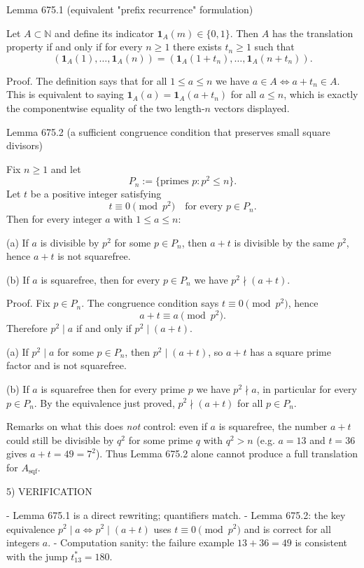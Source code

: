 Lemma 675.1 (equivalent "prefix recurrence" formulation)

Let $A\subset\mathbb N$ and define its indicator $\mathbf 1_A(m)\in\{0,1\}$. Then $A$ has the translation property if and only if for every $n\ge 1$ there exists $t_n\ge 1$ such that
\[
(\mathbf 1_A(1),\dots,\mathbf 1_A(n))=(\mathbf 1_A(1+t_n),\dots,\mathbf 1_A(n+t_n)).
\]

Proof.
The definition says that for all $1\le a\le n$ we have $a\in A\iff a+t_n\in A$. This is equivalent to saying $\mathbf 1_A(a)=\mathbf 1_A(a+t_n)$ for all $a\le n$, which is exactly the componentwise equality of the two length-$n$ vectors displayed.


Lemma 675.2 (a sufficient congruence condition that preserves small square divisors)

Fix $n\ge 1$ and let
\[
P_n:=\{\text{primes }p: p^2\le n\}.
\]
Let $t$ be a positive integer satisfying
\[
 t\equiv 0\pmod{p^2}\quad\text{for every }p\in P_n.
\]
Then for every integer $a$ with $1\le a\le n$:

(a) If $a$ is divisible by $p^2$ for some $p\in P_n$, then $a+t$ is divisible by the same $p^2$, hence $a+t$ is not squarefree.

(b) If $a$ is squarefree, then for every $p\in P_n$ we have $p^2\nmid (a+t)$.

Proof.
Fix $p\in P_n$. The congruence condition says $t\equiv 0\pmod{p^2}$, hence
\[
 a+t\equiv a\pmod{p^2}.
\]
Therefore $p^2\mid a$ if and only if $p^2\mid (a+t)$.

(a) If $p^2\mid a$ for some $p\in P_n$, then $p^2\mid(a+t)$, so $a+t$ has a square prime factor and is not squarefree.

(b) If $a$ is squarefree then for every prime $p$ we have $p^2\nmid a$, in particular for every $p\in P_n$. By the equivalence just proved, $p^2\nmid(a+t)$ for all $p\in P_n$.


Remarks on what this does \emph{not} control: even if $a$ is squarefree, the number $a+t$ could still be divisible by $q^2$ for some prime $q$ with $q^2>n$ (e.g. $a=13$ and $t=36$ gives $a+t=49=7^2$). Thus Lemma 675.2 alone cannot produce a full translation for $A_{\mathrm{sqf}}$.

5) VERIFICATION

- Lemma 675.1 is a direct rewriting; quantifiers match.
- Lemma 675.2: the key equivalence $p^2\mid a\iff p^2\mid(a+t)$ uses $t\equiv 0\pmod{p^2}$ and is correct for all integers $a$.
- Computation sanity: the failure example $13+36=49$ is consistent with the jump $t_{13}^*=180$.

